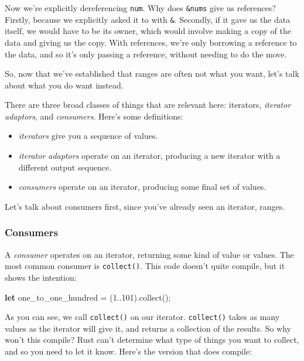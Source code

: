 \documentclass[a4paper,]{book}
\newenvironment{Shaded}{\begin{snugshade}}{\end{snugshade}}
\newcommand{\KeywordTok}[1]{\textcolor[rgb]{0.13,0.29,0.53}{\textbf{{#1}}}}
\newcommand{\DecValTok}[1]{\textcolor[rgb]{0.00,0.00,0.81}{{#1}}}
\newcommand{\NormalTok}[1]{{#1}}
\providecommand{\tightlist}{%
  \setlength{\itemsep}{0pt}\setlength{\parskip}{0pt}}
\begin{document}
Now we're explicitly dereferencing \texttt{num}. Why does
\texttt{\&nums} give us references? Firstly, because we explicitly asked
it to with \texttt{\&}. Secondly, if it gave us the data itself, we
would have to be its owner, which would involve making a copy of the
data and giving us the copy. With references, we're only borrowing a
reference to the data, and so it's only passing a reference, without
needing to do the move.

So, now that we've established that ranges are often not what you want,
let's talk about what you do want instead.

There are three broad classes of things that are relevant here:
iterators, \emph{iterator adaptors}, and \emph{consumers}. Here's some
definitions:

\begin{itemize}
\tightlist
\item
  \emph{iterators} give you a sequence of values.
\item
  \emph{iterator adaptors} operate on an iterator, producing a new
  iterator with a different output sequence.
\item
  \emph{consumers} operate on an iterator, producing some final set of
  values.
\end{itemize}

Let's talk about consumers first, since you've already seen an iterator,
ranges.

\subsubsection{Consumers}\label{consumers}

A \emph{consumer} operates on an iterator, returning some kind of value
or values. The most common consumer is \texttt{collect()}. This code
doesn't quite compile, but it shows the intention:

\begin{Shaded}
\begin{Highlighting}[]
\KeywordTok{let} \NormalTok{one_to_one_hundred = (}\DecValTok{1.}\NormalTok{.}\DecValTok{101}\NormalTok{).collect();}
\end{Highlighting}
\end{Shaded}

As you can see, we call \texttt{collect()} on our iterator.
\texttt{collect()} takes as many values as the iterator will give it,
and returns a collection of the results. So why won't this compile? Rust
can't determine what type of things you want to collect, and so you need
to let it know. Here's the version that does compile:
\end{document}
